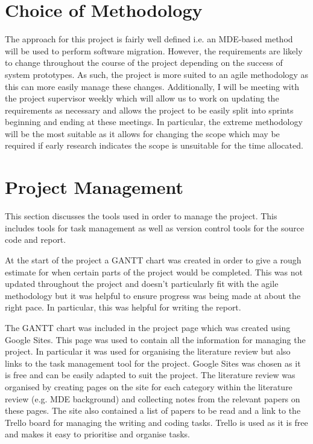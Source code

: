 \documentclass{UoYCSproject}
\begin{document}
\section{Choice of Methodology} \label{choice_meth}
The approach for this project is fairly well defined i.e. an MDE-based method will be used to perform software migration. However, the requirements are likely to change throughout the course of the project depending on the success of system prototypes. As such, the project is more suited to an agile methodology as this can more easily manage these changes. Additionally, I will be meeting with the project supervisor weekly which will allow us to work on updating the requirements as necessary and allows the project to be easily split into sprints beginning and ending at these meetings. In particular, the extreme methodology will be the most suitable as it allows for changing the scope which may be required if early research indicates the scope is unsuitable for the time allocated.

\section{Project Management} \label{proj_mgmt}
This section discusses the tools used in order to manage the project. This includes tools for task management as well as version control tools for the source code and report.

At the start of the project a GANTT chart was created in order to give a rough estimate for when certain parts of the project would be completed. This was not updated throughout the project and doesn't particularly fit with the agile methodology but it was helpful to ensure progress was being made at about the right pace. In particular, this was helpful for writing the report.

The GANTT chart was included in the project page which was created using Google Sites. This page was used to contain all the information for managing the project. In particular it was used for organising the literature review but also links to the task management tool for the project. Google Sites was chosen as it is free and can be easily adapted to suit the project. The literature review was organised by creating pages on the site for each category within the literature review (e.g. MDE background) and collecting notes from the relevant papers on these pages. The site also contained a list of papers to be read and a link to the Trello board for managing the writing and coding tasks. Trello is used as it is free and makes it easy to prioritise and organise tasks.
\end{document}
